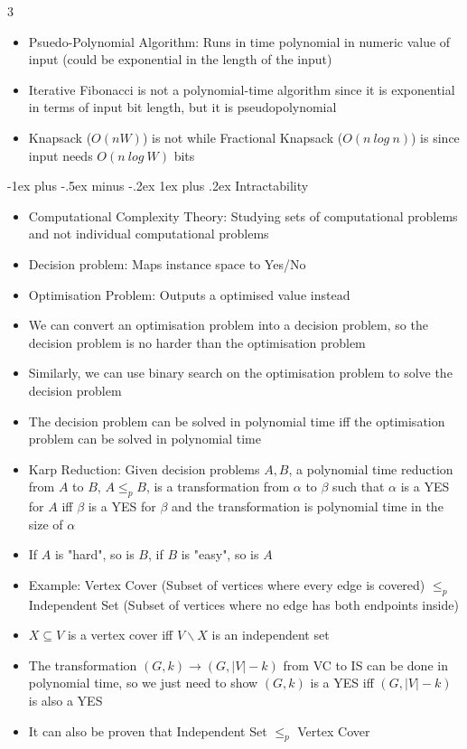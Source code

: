 \documentclass[10pt, landscape]{article}
\makeatletter
\renewcommand{\subsection}{\@startsection{subsection}{3}{0mm}%
                                {-1ex plus -.5ex minus -.2ex}%
                                {1ex plus .2ex}%
                                {\normalfont\small\bfseries}}%
\makeatother
\begin{document}
\begin{multicols*}{3}
\begin{itemize}
    \item Psuedo-Polynomial Algorithm: Runs in time polynomial in numeric value of input (could be exponential in the length of the input)
    \item Iterative Fibonacci is not a polynomial-time algorithm since it is exponential in terms of input bit length, but it is pseudopolynomial
    \item Knapsack ($O(nW)$) is not while Fractional Knapsack ($O(n\ log\ n)$) is since input needs $O(n\ log\ W)$ bits
\end{itemize}

\subsection{Intractability}
\begin{itemize}
    \item Computational Complexity Theory: Studying sets of computational problems and not individual computational problems
    \item Decision problem: Maps instance space to Yes/No
    \item Optimisation Problem: Outputs a optimised value instead
    \item We can convert an optimisation problem into a decision problem, so the decision problem is no harder than the optimisation problem
    \item Similarly, we can use binary search on the optimisation problem to solve the decision problem
    \item The decision problem can be solved in polynomial time iff the optimisation problem can be solved in polynomial time
    \item Karp Reduction: Given decision problems $A,B$, a polynomial time reduction from $A$ to $B$, $A\leq_pB$, is a transformation from $\alpha$ to $\beta$ such that $\alpha$ is a YES for $A$ iff $\beta$ is a YES for $\beta$ and the transformation is polynomial time in the size of $\alpha$
    \item If $A$ is "hard", so is $B$, if $B$ is "easy", so is $A$
    \item Example: Vertex Cover (Subset of vertices where every edge is covered) $\leq_p$ Independent Set (Subset of vertices where no edge has both endpoints inside)
    \item $X\subseteq V$ is a vertex cover iff $V\backslash X$ is an independent set
    \item The transformation $(G,k) \rightarrow (G, |V|-k)$ from VC to IS can be done in polynomial time, so we just need to show $(G,k)$ is a YES iff $(G, |V|-k)$ is also a YES
    \item It can also be proven that Independent Set $\leq_p$ Vertex Cover
\end{itemize}


\end{multicols*}
\end{document}
